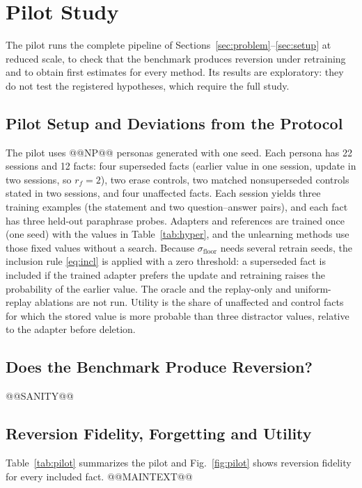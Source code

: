 \section{Pilot Study}
\label{sec:results}
The pilot runs the complete pipeline of Sections~\ref{sec:problem}--\ref{sec:setup} at reduced scale, to check that the benchmark produces reversion under retraining and to obtain first estimates for every method. Its results are exploratory: they do not test the registered hypotheses, which require the full study.

\subsection{Pilot Setup and Deviations from the Protocol}
\label{sec:pilot-setup}
The pilot uses @@NP@@ personas generated with one seed. Each persona has 22 sessions and 12 facts: four superseded facts (earlier value in one session, update in two sessions, so $r_f = 2$), two erase controls, two matched nonsuperseded controls stated in two sessions, and four unaffected facts. Each session yields three training examples (the statement and two question--answer pairs), and each fact has three held-out paraphrase probes. Adapters and references are trained once (one seed) with the values in Table~\ref{tab:hyper}, and the unlearning methods use those fixed values without a search. Because $\sigma_{\mathrm{floor}}$ needs several retrain seeds, the inclusion rule \eqref{eq:incl} is applied with a zero threshold: a superseded fact is included if the trained adapter prefers the update and retraining raises the probability of the earlier value. The oracle and the replay-only and uniform-replay ablations are not run. Utility is the share of unaffected and control facts for which the stored value is more probable than three distractor values, relative to the adapter before deletion.

\subsection{Does the Benchmark Produce Reversion?}
\label{sec:pilot-sanity}
@@SANITY@@

\subsection{Reversion Fidelity, Forgetting and Utility}
\label{sec:pilot-main}
Table~\ref{tab:pilot} summarizes the pilot and Fig.~\ref{fig:pilot} shows reversion fidelity for every included fact. @@MAINTEXT@@

